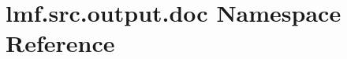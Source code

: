 \hypertarget{namespacelmf_1_1src_1_1output_1_1doc}{\section{lmf.\+src.\+output.\+doc Namespace Reference}
\label{namespacelmf_1_1src_1_1output_1_1doc}
}
